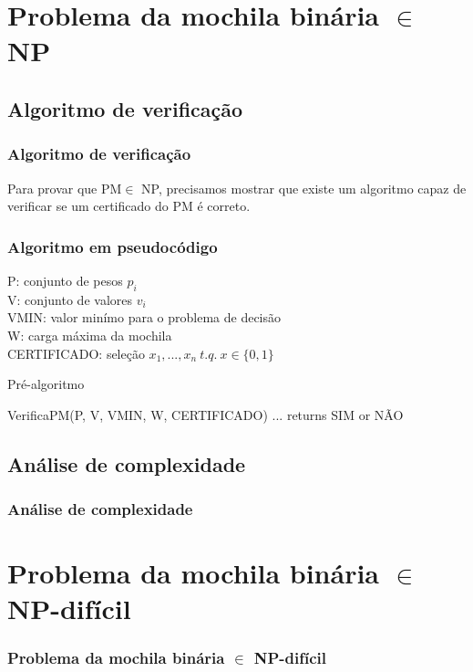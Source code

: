 \documentclass{beamer}
\begin{document}

\section{Problema da mochila binária $\in$ NP}

\subsection{Algoritmo de verificação}
\begin{frame}
    \frametitle{Algoritmo de verificação}
    Para provar que PM\footnotemark $\in$ NP, precisamos mostrar que existe um algoritmo
    capaz de verificar se um certificado do PM é correto.

\end{frame}


\begin{frame}[fragile]
    \frametitle{Algoritmo em pseudocódigo}

    P: conjunto de pesos $p_{i}$ \\
    V: conjunto de valores $v_{i}$ \\
    VMIN: valor minímo para o problema de decisão \\
    W: carga máxima da mochila \\
    CERTIFICADO: seleção $x_{1},...,x_{n}\ t.q.\ x \in \{0,1\}$ \\

    \begin{block}{Pré-algoritmo}
    \begin{semiverbatim}
    VerificaPM(P, V, VMIN, W, CERTIFICADO)
        ...
        returns SIM or NÃO
    \end{semiverbatim}
    \end{block}

\end{frame}

\subsection{Análise de complexidade}
\begin{frame}
\frametitle{Análise de complexidade}
\end{frame}


\section{Problema da mochila binária $\in$ NP-difícil}
\begin{frame}
\frametitle{Problema da mochila binária $\in$ NP-difícil}
\end{frame}
\end{document}
